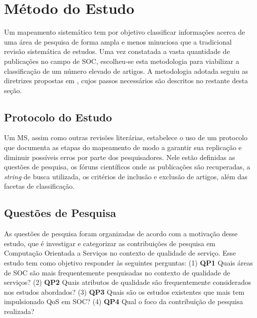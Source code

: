 
\section{Método do Estudo}\label{sec:review_method}

Um mapeamento sistemático tem por objetivo classificar informações acerca de uma área de pesquisa de forma ampla e menos minuciosa que a tradicional revisão sistemática de estudos. Uma vez constatada a vasta quantidade de publicações no campo de SOC, escolheu-se esta metodologia para viabilizar a classifica\c c\~{a}o de um número elevado de artigos. A metodologia adotada seguiu as diretrizes propostas em \cite{petersen:sms2008}, cujos passos necess\'{a}rios s\~{a}o descritos no restante desta se\c c\~{a}o.

\subsection{Protocolo do Estudo}

Um MS, assim como outras revisões literárias, estabelece o uso de um protocolo que documenta as etapas do mapeamento de modo a garantir sua replicação e diminuir possíveis erros por parte dos pesquisadores. Nele estão definidas as questões de pesquisa, os fóruns científicos onde as publicações s\~{a}o recuperadas, a \textit{string} de busca utilizada, os critérios de inclusão e exclusão de artigos, além das facetas de classificação.

\subsection{Quest\~{o}es de Pesquisa}\label{sec:questoesPesquisa}

As questões de pesquisa foram organizadas de acordo com a motivação desse estudo, que é investigar e categorizar as contribuições de pesquisa em Computação Orientada a Serviços no contexto de qualidade de serviço. Esse estudo tem como objetivo responder às seguintes perguntas: (1) \textbf{QP1} Quais áreas de SOC são mais frequentemente pesquisadas no contexto de qualidade de serviços? (2) \textbf{QP2} Quais atributos de qualidade são frequentemente considerados nos estudos abordados? (3) \textbf{QP3} Quais s\~{a}o os estudos existentes que mais tem impulsionado QoS em SOC? (4) \textbf{QP4} Qual o foco da contribuição de pesquisa realizada?

